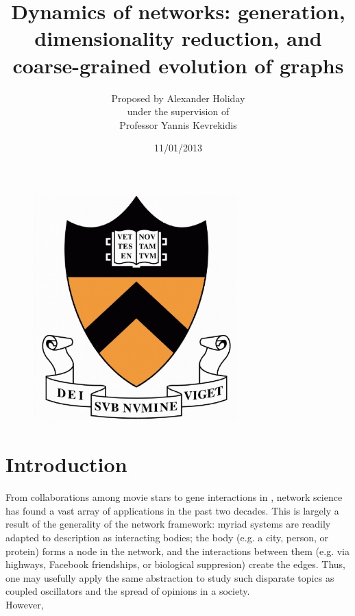 \documentclass[11pt]{article}
\begin{document}
\title{Dynamics of networks: generation, dimensionality reduction, and coarse-grained evolution of graphs}
\author{\LARGE Proposed by Alexander Holiday\vspace{3mm}\\\large under the supervision of\vspace{3mm}\\\LARGE Professor Yannis Kevrekidis}
\date{11/01/2013}
\maketitle

\begin{figure}[h]
  \centering
  \includegraphics[width=80mm]{princeton_shield}
\end{figure}

\section{Introduction}

From collaborations among movie stars \cite{barbasi} to gene interactions in \cite{harvardCelegans}, network science has found a vast array of applications in the past two decades. This is largely a result of the generality of the network framework: myriad systems are readily adapted to description as interacting bodies; the body (e.g. a city, person, or protein) forms a node in the network, and the interactions between them (e.g. via highways, Facebook friendships, or biological suppresion) create the edges. Thus, one may usefully apply the same abstraction to study such disparate topics as coupled oscillators and the spread of opinions in a society. \\
However, 

%
%
\end{document}
